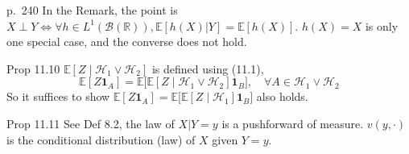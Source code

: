 \begin{note}{p.~240}
    In the Remark, the point is $X\perp Y\iff \forall h\in L^1(\mathcal{B}(\mathbb{R})), \mathbb{E}[h(X)|Y]=\mathbb{E}[h(X)]$. $h(X)=X$ is only one special case, and the converse does not hold.
\end{note}

\begin{note}{Prop 11.10}
    $\mathbb{E}\left[Z \mid \mathcal{H}_{1} \vee \mathcal{H}_{2}\right]$ is defined using (11.1),
    \[
    \mathbb{E}[Z\mathbf{1}_A]=\mathbb{E}\bigg[\mathbb{E}\left[Z \mid \mathcal{H}_{1} \vee \mathcal{H}_{2}\right]\mathbf{1}_B\bigg],\quad \forall A\in\mathcal{H}_{1} \vee \mathcal{H}_{2}
    \]
    So it suffices to show $\mathbb{E}[Z\mathbf{1}_A]=\mathbb{E}\bigg[\mathbb{E}\left[Z \mid \mathcal{H}_{1}\right]\mathbf{1}_B\bigg]$ also holds.
\end{note}

\begin{note}{Prop 11.11}
    See Def 8.2, the law of $X|Y=y$ is a pushforward of measure. $v(y,\cdot)$ is the conditional distribution (law) of $X$ given $Y=y$. 
\end{note}